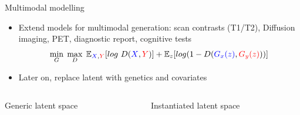 \documentclass[8pt,xcolor=table,aspectratio=169]{beamer}
\begin{document}
%



\begin{frame}{Multimodal modelling}


\begin{itemize}
\item Extend models for multimodal generation: scan contrasts (T1/T2), Diffusion imaging, PET, diagnostic report, cognitive tests
 $$\min_G\; \max_D\; \mathbb{E}_{\textcolor{blue}{X},\textcolor{red}{Y}}[log\ D(\textcolor{blue}{X},\textcolor{red}{Y})] + \mathbb{E}_z[log (1 - D(\textcolor{blue}{G_x(z)}, \textcolor{red}{G_y(z)}))] $$
 \item Later on, replace latent with genetics and covariates
\end{itemize}

\begin{columns}
\begin{column}{0.5\textwidth}
\centering
{} Generic latent space\\
 
\end{column}
\begin{column}{0.5\textwidth}
\centering
{} Instantiated latent space\\
 
\end{column}
\end{columns}


\end{frame}
\end{document}
